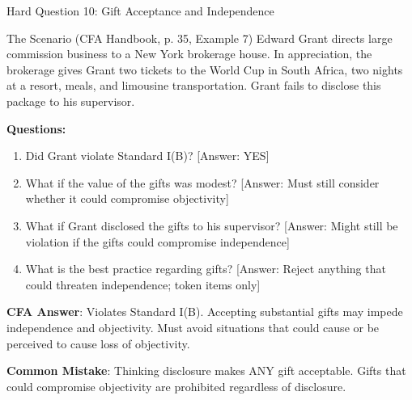 \documentclass{beamer}
\begin{document}
	\begin{frame}{Hard Question 10: Gift Acceptance and Independence}
		\begin{block}{The Scenario (CFA Handbook, p. 35, Example 7)}
			Edward Grant directs large commission business to a New York brokerage house. In appreciation, the brokerage gives Grant two tickets to the World Cup in South Africa, two nights at a resort, meals, and limousine transportation. Grant fails to disclose this package to his supervisor.
		\end{block}
		
		\vspace{0.2cm}
		\textbf{Questions:}
		\begin{enumerate}
			\item Did Grant violate Standard I(B)? \textcolor{cfared}{[Answer: YES]}
			\item What if the value of the gifts was modest? \textcolor{cfared}{[Answer: Must still consider whether it could compromise objectivity]}
			\item What if Grant disclosed the gifts to his supervisor? \textcolor{cfared}{[Answer: Might still be violation if the gifts could compromise independence]}
			\item What is the best practice regarding gifts? \textcolor{cfared}{[Answer: Reject anything that could threaten independence; token items only]}
		\end{enumerate}
		
		\vspace{0.2cm}
		\textcolor{cfablue}{\textbf{CFA Answer}}: Violates Standard I(B). Accepting substantial gifts may impede independence and objectivity. Must avoid situations that could cause or be perceived to cause loss of objectivity.
		
		\vspace{0.1cm}
		\textcolor{cfared}{\textbf{Common Mistake}}: Thinking disclosure makes ANY gift acceptable. Gifts that could compromise objectivity are prohibited regardless of disclosure.
	\end{frame}
	
\end{document}
